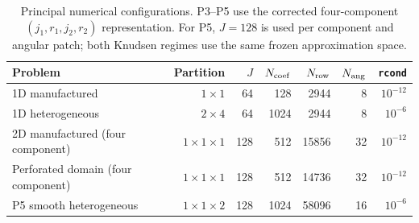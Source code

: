 \begin{table}[t]
\centering
\caption{Principal numerical configurations. P3--P5 use the corrected four-component $(j_1,r_1,j_2,r_2)$ representation. For P5, $J=128$ is used per component and angular patch; both Knudsen regimes use the same frozen approximation space.}
\label{tab:configurations}
\begin{tabular}{lrrrrrr}
\toprule
Problem & Partition & $J$ & $N_{\rm coef}$ & $N_{\rm row}$ & $N_{\rm ang}$ & \texttt{rcond}\\
\midrule
1D manufactured & $1\times1$ & 64 & 128 & 2944 & 8 & $10^{-12}$\\
1D heterogeneous & $2\times4$ & 64 & 1024 & 2944 & 8 & $10^{-6}$\\
2D manufactured (four component) & $1\times1\times1$ & 128 & 512 & 15856 & 32 & $10^{-12}$\\
Perforated domain (four component) & $1\times1\times1$ & 128 & 512 & 14736 & 32 & $10^{-12}$\\
P5 smooth heterogeneous & $1\times1\times2$ & 128 & 1024 & 58096 & 16 & $10^{-6}$\\
\bottomrule
\end{tabular}
\end{table}
